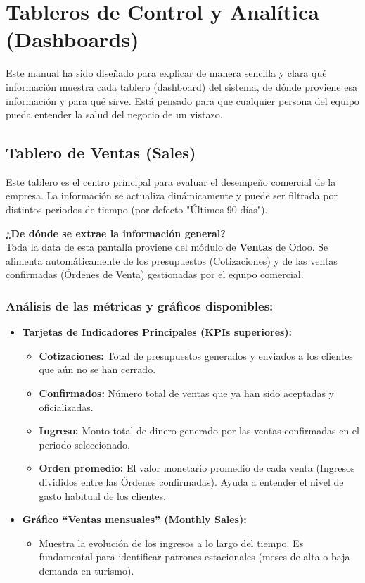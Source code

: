 \section{Tableros de Control y Analítica (Dashboards)}

Este manual ha sido diseñado para explicar de manera sencilla y clara qué información muestra cada tablero (dashboard) del sistema, de dónde proviene esa información y para qué sirve. Está pensado para que cualquier persona del equipo pueda entender la salud del negocio de un vistazo.

\subsection{Tablero de Ventas (Sales)}
Este tablero es el centro principal para evaluar el desempeño comercial de la empresa. La información se actualiza dinámicamente y puede ser filtrada por distintos periodos de tiempo (por defecto "Últimos 90 días").

\textbf{¿De dónde se extrae la información general?}\\
Toda la data de esta pantalla proviene del módulo de \textbf{Ventas} de Odoo. Se alimenta automáticamente de los presupuestos (Cotizaciones) y de las ventas confirmadas (Órdenes de Venta) gestionadas por el equipo comercial.

\subsubsection*{Análisis de las métricas y gráficos disponibles:}
\begin{itemize}[leftmargin=*]
    \item \textbf{Tarjetas de Indicadores Principales (KPIs superiores):}
    \begin{itemize}
        \item \textbf{Cotizaciones:} Total de presupuestos generados y enviados a los clientes que aún no se han cerrado.
        \item \textbf{Confirmados:} Número total de ventas que ya han sido aceptadas y oficializadas.
        \item \textbf{Ingreso:} Monto total de dinero generado por las ventas confirmadas en el periodo seleccionado.
        \item \textbf{Orden promedio:} El valor monetario promedio de cada venta (Ingresos divididos entre las Órdenes confirmadas). Ayuda a entender el nivel de gasto habitual de los clientes.
    \end{itemize}
    \item \textbf{Gráfico ``Ventas mensuales'' (Monthly Sales):}
    \begin{itemize}
        \item Muestra la evolución de los ingresos a lo largo del tiempo. Es fundamental para identificar patrones estacionales (meses de alta o baja demanda en turismo).
    \end{itemize}
\end{itemize}

